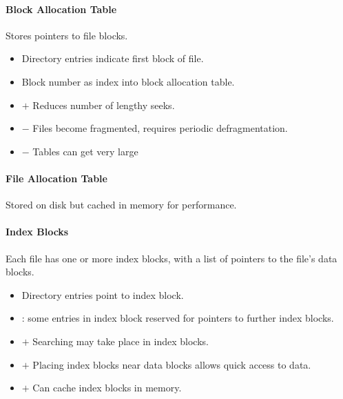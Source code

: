 \documentclass[twocolumn,english]{article}
\let\emph\relax
\begin{document}
\paragraph{Block Allocation Table}

Stores pointers to file blocks.
\begin{itemize}
\item Directory entries indicate first block of file.
\item Block number as index into block allocation table.
\item $+$ Reduces number of lengthy seeks.
\item $-$ Files become fragmented, requires periodic defragmentation.
\item $-$ Tables can get very large
\end{itemize}

\paragraph{File Allocation Table}

Stored on disk but cached in memory for performance.

\paragraph{Index Blocks}

Each file has one or more index blocks, with a list of pointers to
the file's data blocks.
\begin{itemize}
\item Directory entries point to index block.
\item \emph{Chaining}: some entries in index block reserved for pointers
to further index blocks.
\item $+$ Searching may take place in index blocks.
\item $+$ Placing index blocks near data blocks allows quick access to
data.
\item $+$ Can cache index blocks in memory.
\end{itemize}
\end{document}

